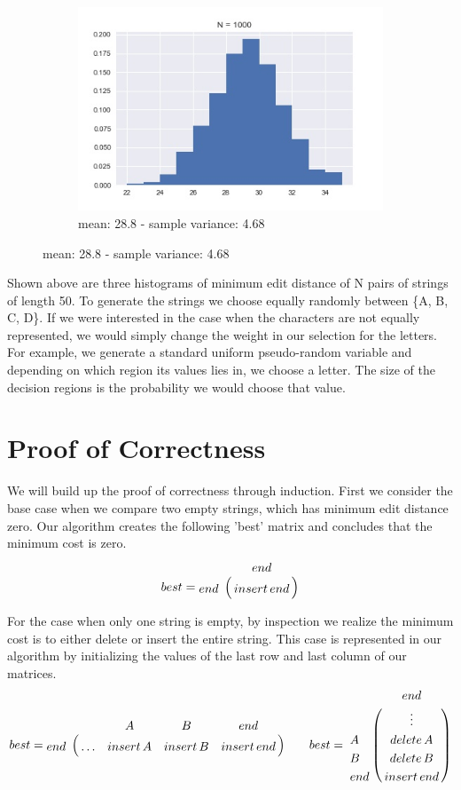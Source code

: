 \documentclass{article}
\begin{document}
\begin{figure}[h!]
\begin{subfigure}[b]{0.45\linewidth}
    \includegraphics[width=\linewidth]{Edit_Distance_Histogram_1000.jpg}
    \caption{mean: 28.8 - sample variance: 4.68}
  \end{subfigure}
  
  \label{fig:coffee}
\end{figure}

Shown above are three histograms of minimum edit distance of N pairs of strings of length 50.  To generate the strings we choose equally randomly between \{A, B, C, D\}.  If we were interested in the case when the characters are not equally represented, we would simply change the weight in our selection for the letters.  For example, we generate a standard uniform pseudo-random variable and depending on which region its values lies in, we choose a letter.  The size of the decision regions is the probability we would choose that value.

\section*{Proof of Correctness}

We will build up the proof of correctness through induction.  First we consider the base case when we compare two empty strings, which has minimum edit distance zero.  Our algorithm creates the following 'best' matrix and concludes that the minimum cost is zero.
\begin{align*}
best = \bordermatrix{~ & end \cr
                  		end & insert\,end \cr}
\end{align*}

For the case when only one string is empty, by inspection we realize the minimum cost is to either delete or insert the entire string.  This case is represented in our algorithm by initializing the values of the last row and last column of our matrices. 
\begin{align*}
best = \bordermatrix{~ & & A & B & end \cr
                  		end & \hdots & insert \, A & insert\,B & insert\,end  \cr} \qquad
best = \bordermatrix{~ & end \cr
				 & \vdots \cr
				 A & delete \, A \cr
				 B & delete \, B \cr
                  		 end & insert\,end \cr}
\end{align*}
\end{document}
